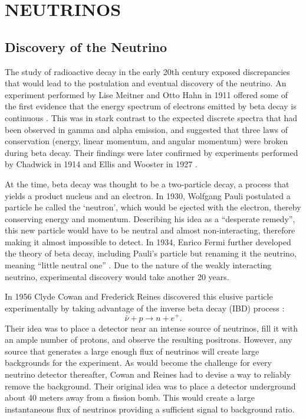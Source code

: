 \chapter{\uppercase{Neutrinos}} \label{ch:Neutrinos}

\section{Discovery of the Neutrino} \label{sec:NeutrinoDiscovery}

The study of radioactive decay in the early 20th century exposed discrepancies that would lead to the postulation and eventual discovery of the neutrino.
An experiment performed by Lise Meitner and Otto Hahn in 1911 offered some of the first evidence that the energy spectrum of electrons emitted by beta decay is continuous \cite{Hahn:1911}. 
This was in stark contrast to the expected discrete spectra that had been observed in gamma and alpha emission, and suggested that three laws of conservation (energy, linear momentum, and angular momentum) were broken during beta decay. 
Their findings were later confirmed by experiments performed by Chadwick in 1914 \cite{Chadwick:1914zz} and Ellis and Wooster in 1927 \cite{Ellis:1927}. 

At the time, beta decay was thought to be a two-particle decay, a process that yields a product nucleus and an electron.
In 1930, Wolfgang Pauli postulated a particle he called the `neutron', which would be ejected with the electron, thereby conserving energy and momentum.
Describing his idea as a ``desperate remedy'', this new particle would have to be neutral and almost non-interacting, therefore making it almost impossible to detect.
In 1934, Enrico Fermi further developed the theory of beta decay, including Pauli's particle but renaming it the neutrino, meaning ``little neutral one'' \cite{Fermi:1934hr}.
Due to the nature of the weakly interacting neutrino, experimental discovery would take another 20 years.

In 1956 Clyde Cowan and Frederick Reines discovered this elusive particle experimentally by taking advantage of the inverse beta decay (IBD) process \cite{Cowan}:
\begin{equation}
	\bar{\nu} + p \rightarrow n + e^{+}.
\end{equation}
Their idea was to place a detector near an intense source of neutrinos, fill it with an ample number of protons, and observe the resulting positrons. 
However, any source that generates a large enough flux of neutrinos will create large backgrounds for the experiment. 
As would become the challenge for every neutrino detector thereafter, Cowan and Reines had to devise a way to reliably remove the background.
Their original idea was to place a detector underground about 40 meters away from a fission bomb. 
This would create a large instantaneous flux of neutrinos providing a sufficient signal to background ratio. 

